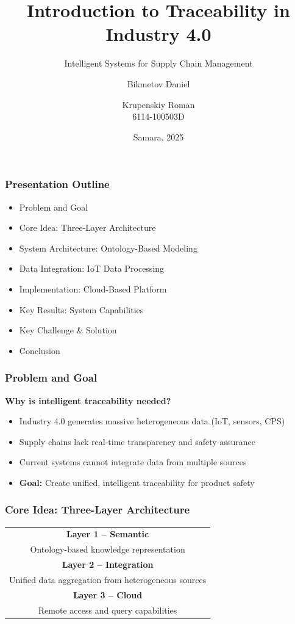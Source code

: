 \documentclass[11pt]{beamer}
\title{Introduction to Traceability in Industry 4.0}
\subtitle{Intelligent Systems for Supply Chain Management}
\author{Bikmetov Daniel \and Krupenskiy Roman \\ 6114-100503D}
\date{Samara, 2025}
\institute{Samara State Aerospace University}
\begin{document}
\frame{\titlepage}

\begin{frame}
  \frametitle{Presentation Outline}
  \begin{itemize}
    \item Problem and Goal
    \item Core Idea: Three-Layer Architecture
    \item System Architecture: Ontology-Based Modeling
    \item Data Integration: IoT Data Processing
    \item Implementation: Cloud-Based Platform
    \item Key Results: System Capabilities
    \item Key Challenge \& Solution
    \item Conclusion
  \end{itemize}
\end{frame}

\begin{frame}
  \frametitle{Problem and Goal}
  
  \textbf{Why is intelligent traceability needed?}
  
  \begin{itemize}
    \item Industry 4.0 generates massive heterogeneous data (IoT, sensors, CPS)
    \item Supply chains lack real-time transparency and safety assurance
    \item Current systems cannot integrate data from multiple sources
    \item \textbf{Goal:} Create unified, intelligent traceability for product safety
  \end{itemize}
\end{frame}

\begin{frame}
  \frametitle{Core Idea: Three-Layer Architecture}
  
  \begin{center}
    \begin{tabular}{|c|}
      \hline
      \textbf{Layer 1 -- Semantic} \\
      Ontology-based knowledge representation \\
      \hline
      \textbf{Layer 2 -- Integration} \\
      Unified data aggregation from heterogeneous sources \\
      \hline
      \textbf{Layer 3 -- Cloud} \\
      Remote access and query capabilities \\
      \hline
    \end{tabular}
  \end{center}
\end{frame}
\end{document}
